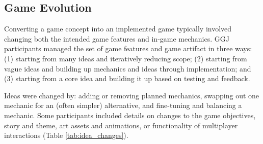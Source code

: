 \documentclass{sig-alternate}
\begin{document}
\subsection{Game Evolution}
Converting a game concept into an implemented game typically involved changing both the intended game features and in-game mechanics. 
GGJ participants managed the set of game features and game artifact in three ways:
(1) starting from many ideas and iteratively reducing scope;
(2) starting from vague ideas and building up mechanics and ideas through implementation;
and
(3) starting from a core idea and building it up based on testing and feedback.




Ideas were changed by: adding or removing planned mechanics, swapping out one mechanic for an (often simpler) alternative, and fine-tuning and balancing a mechanic. Some participants included details on changes to the game objectives, story and theme, art assets and animations, or functionality of multiplayer interactions (Table \ref{tab:idea_changes}).
\end{document}
